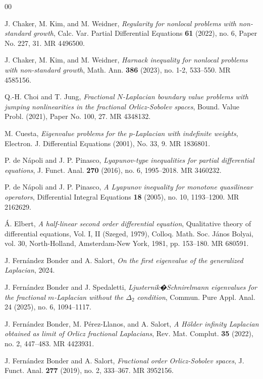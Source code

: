 \documentclass[12pt,reqno]{amsart}
\theoremstyle{definition}
\theoremstyle{remark}
\numberwithin{equation}{section}
\begin{document}
\begin{thebibliography}{00}
 

J. Chaker, M. Kim, and M. Weidner, \emph{Regularity for nonlocal problems with non-standard growth}, Calc. Var. Partial Differential Equations \textbf{61} (2022), no. 6, Paper No. 227, 31. MR 4496500.

J. Chaker, M. Kim, and M. Weidner, \emph{Harnack inequality for nonlocal problems with non-standard growth}, Math. Ann. \textbf{386} (2023), no. 1-2, 533--550. MR 4585156.

Q.-H. Choi and T. Jung, \emph{Fractional $N$-Laplacian boundary value problems with jumping nonlinearities in the fractional Orlicz-Sobolev spaces}, Bound. Value Probl. (2021), Paper No. 100, 27. MR 4348132.

M. Cuesta, \emph{Eigenvalue problems for the $p$-Laplacian with indefinite weights}, Electron. J. Differential Equations (2001), No. 33, 9. MR 1836801.

P.  de N\'{a}poli and J. P. Pinasco, \emph{Lyapunov-type inequalities for partial differential equations}, J. Funct. Anal. \textbf{270} (2016), no. 6, 1995--2018. MR 3460232.

P.  de N\'{a}poli and J. P. Pinasco, \emph{A Lyapunov inequality for monotone quasilinear operators}, Differential Integral Equations \textbf{18} (2005), no. 10, 1193--1200. MR 2162629.

\'{A}. Elbert, \emph{A half-linear second order differential equation}, Qualitative theory of differential equations, Vol. I, II (Szeged, 1979), Colloq. Math. Soc. J\'{a}nos Bolyai, vol. 30, North-Holland, Amsterdam-New York, 1981, pp. 153--180. MR 680591.
 
 J. Fern\'andez Bonder and A. Salort, \emph{On the first eigenvalue of the generalized Laplacian}, 2024.
 
 J. Fern\'andez Bonder and J.  Spedaletti, \emph{Ljusternik�Schnirelmann eigenvalues for the fractional $m$-Laplacian without the $\Delta_2$ condition}, Commun. Pure Appl. Anal. 24 (2025), no. 6, 1094--1117.
 
J. Fern\'andez Bonder, M. P\'{e}rez-Llanos, and A.  Salort, \emph{A H\"{o}lder infinity Laplacian obtained as limit of Orlicz fractional Laplacians}, Rev. Mat. Complut. \textbf{35} (2022), no. 2, 447--483. MR 4423931.

J. Fern\'andez Bonder and A. Salort, \emph{Fractional order Orlicz-Sobolev spaces}, J. Funct. Anal. \textbf{277} (2019), no. 2, 333--367. MR 3952156.


\end{thebibliography}
\end{document}
